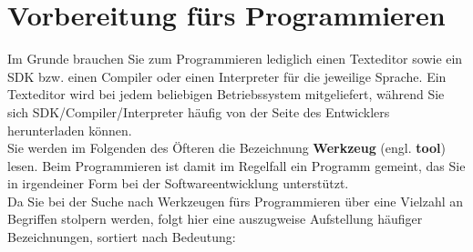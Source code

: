 \chapter{Vorbereitung fürs Programmieren}

Im Grunde brauchen Sie zum Programmieren lediglich einen Texteditor sowie ein SDK bzw. einen Compiler oder einen Interpreter für die jeweilige Sprache. Ein Texteditor wird bei jedem beliebigen Betriebssystem mitgeliefert, während Sie sich SDK/Compiler/Interpreter häufig von der Seite des Entwicklers herunterladen können.\\

Sie werden im Folgenden des Öfteren die Bezeichnung \textbf{Werkzeug} (engl. \textbf{tool}) lesen. Beim Programmieren ist damit im Regelfall ein Programm gemeint, das Sie in irgendeiner Form bei der Softwareentwicklung unterstützt.\\

Da Sie bei der Suche nach Werkzeugen fürs Programmieren über eine Vielzahl an Begriffen stolpern werden, folgt hier eine auszugweise Aufstellung häufiger Bezeichnungen, sortiert nach Bedeutung:\\


